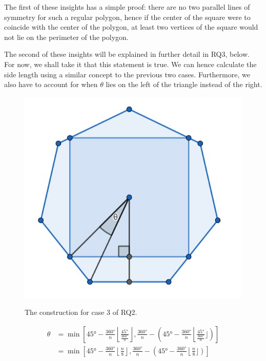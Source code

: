 \documentclass[12pt]{scrartcl}
\begin{document}
The first of these insights has a simple proof: there are no two parallel lines of symmetry for such a regular polygon, hence if the center of the square were to coincide with the center of the polygon, at least two vertices of the square would not lie on the perimeter of the polygon.

The second of these insights will be explained in further detail in RQ3, below. For now, we shall take it that this statement is true. We can hence calculate the side length using a similar concept to the previous two cases. Furthermore, we also have to account for when $\theta$ lies on the left of the triangle instead of the right.

\begin{figure}[htpb]
	\centering
	\includegraphics[scale=.75]{images/rq2_3.jpg}
	\label{fig:rq2_3_img}
	\caption{The construction for case 3 of RQ2.}
\end{figure}

\begin{align*}
  \theta & = \min\left[\ang{45} - \frac{\ang{360}}{n}\left\lfloor \frac{\ang{45}}{\frac{\ang{360}}{n}} \right\rfloor, \frac{\ang{360}}{n} - \left(\ang{45} - \frac{\ang{360}}{n}\left\lfloor \frac{\ang{45}}{\frac{\ang{360}}{n}} \rfloor\right)\right]     \\
  & = \min\left[\ang{45} - \frac{\ang{360}}{n}\left\lfloor \frac{n}{8} \right\rfloor, \frac{\ang{360}}{n} - \left(\ang{45} - \frac{\ang{360}}{n}\left\lfloor \frac{n}{8} \rfloor\right)\right]     \\
\end{align*}
\end{document}

